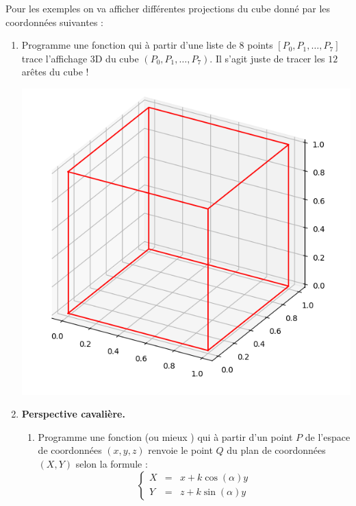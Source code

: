 \documentclass[11pt,class=report,crop=false]{standalone}
\begin{document}

\begin{activite}[Perspective]
	
	


Pour les exemples on va afficher différentes projections du cube donné par les coordonnées suivantes :

\begin{enumerate}
	
	\item Programme une fonction  qui à partir d'une liste de $8$ points $[P_0,P_1,\ldots,P_7]$
	trace l'affichage 3D du cube $(P_0,P_1,\ldots,P_7)$. Il s'agit juste de tracer les $12$ arêtes du cube !
	
	\begin{center}
		\includegraphics[scale=\myscale,scale=0.4]{ecran-perspective-1}
	\end{center}

	\item \textbf{Perspective cavalière.}
	\begin{enumerate}
		\item Programme une fonction  (ou mieux )
		qui à partir d'un point $P$ de l'espace de coordonnées $(x,y,z)$ renvoie le point $Q$ du plan de coordonnées $(X,Y)$ selon la formule :
		$$\left\{
		\begin{array}{rcl}
		X &=& x + k \cos(\alpha)y \\
		Y &=& z + k \sin(\alpha)y
		\end{array}
		\right.$$
		

\end{enumerate}
\end{enumerate}
\end{activite}
\end{document}
